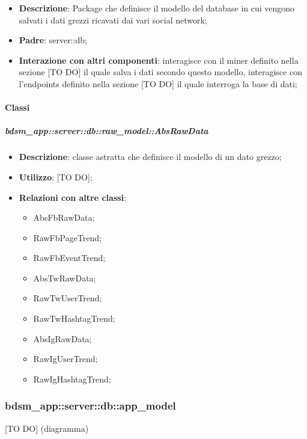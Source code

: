  \begin{itemize}
    \item \textbf{Descrizione}: Package che definisce il modello del database in cui vengono salvati i dati grezzi ricavati dai vari social network;
    \item \textbf{Padre}: server::db;
    \item \textbf{Interazione con altri componenti}: interagisce con il miner definito nella sezione [TO DO] il quale salva i dati secondo questo modello, interagisce con l'endpoints definito nella sezione [TO DO] il quale interroga la base di dati;
  \end{itemize}
  		
  		\paragraph{Classi} %
			\subparagraph{bdsm\_app::server::db::raw\_model::AbsRawData} %
			\label{subp:bdsm_app_server_raw_model_AbsRawData}
				\begin{itemize}
					\item \textbf{Descrizione}: classe astratta che definisce il modello di un dato grezzo;
					\item \textbf{Utilizzo}: [TO DO];
					\item \textbf{Relazioni con altre classi}:
					\begin{itemize}
						\item AbsFbRawData;
						\item RawFbPageTrend;
						\item RawFbEventTrend;
						\item AbsTwRawData;
						\item RawTwUserTrend;
						\item RawTwHashtagTrend;	
						\item AbsIgRawData;
						\item RawIgUserTrend;
						\item RawIgHashtagTrend;				
					\end{itemize}
				\end{itemize}

  \subsubsection{bdsm\_app::server::db::app\_model} %
  \label{ssub:bdsm_app_server_app_model}
  [TO DO] (diagramma) \newline \newline


